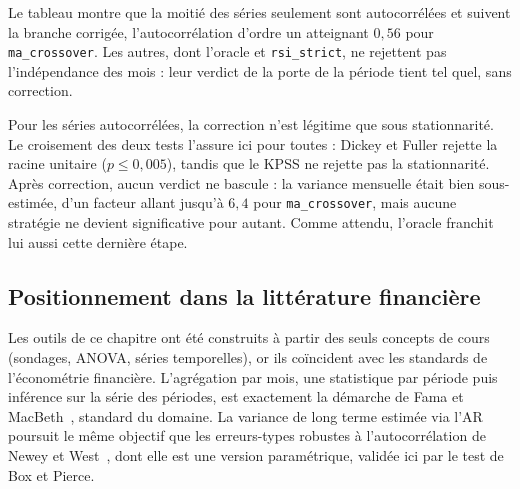 Le tableau montre que la moitié des séries seulement sont autocorrélées et
suivent la branche corrigée, l'autocorrélation d'ordre un atteignant $0{,}56$
pour \texttt{ma\_crossover}. Les autres, dont l'oracle et \texttt{rsi\_strict},
ne rejettent pas l'indépendance des mois : leur verdict de la porte de la
période tient tel quel, sans correction.

Pour les séries autocorrélées, la correction n'est légitime que sous
stationnarité. Le croisement des deux tests l'assure ici pour toutes : Dickey
et Fuller rejette la racine unitaire ($p \le 0{,}005$), tandis que le KPSS ne
rejette pas la stationnarité. Après correction, aucun verdict ne bascule : la
variance mensuelle était bien sous-estimée, d'un facteur allant jusqu'à
$6{,}4$ pour \texttt{ma\_crossover}, mais aucune stratégie ne devient
significative pour autant. Comme attendu, l'oracle franchit lui aussi cette
dernière étape.



\subsection{Positionnement dans la littérature financière}
\label{sec:b1-positionnement}

Les outils de ce chapitre ont été construits à partir des seuls concepts de
cours (sondages, ANOVA, séries temporelles), or ils coïncident avec les
standards de l'économétrie financière.
L'agrégation par mois, une statistique par période puis inférence
sur la série des périodes, est exactement la démarche de
Fama et MacBeth~\cite{famamacbeth1973}, standard du domaine.
La variance de long terme estimée via l'AR poursuit le même
objectif que les erreurs-types robustes à l'autocorrélation de
Newey et West~\cite{neweywest1987}, dont elle est une version paramétrique,
validée ici par le test de Box et Pierce.


